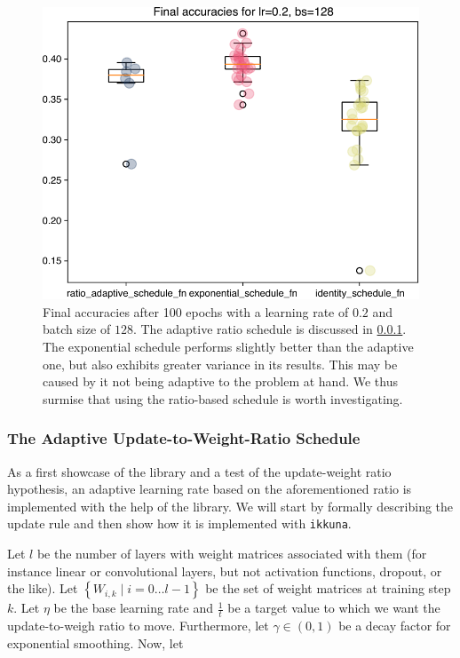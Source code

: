 \begin{figure}
    \centering
    \includegraphics[width=\linewidth]{gfx/diagrams/experiments/experiment_validation.pdf}
    \caption[Fixed-Ratio: Final accuracies after 100 epochs]{Final accuracies
        after 100 epochs with a learning rate of $0.2$ and batch size of $128$.
        The adaptive ratio schedule is discussed in \cref{subsec:ratio-schedule}.
        The exponential schedule performs slightly better than the adaptive one,
        but also exhibits greater variance in its results. This may be caused by
        it not being adaptive to the problem at hand. We thus surmise that using the
        ratio-based schedule is worth investigating.}
    \label{fig:validation1}
\end{figure}

\subsubsection{The Adaptive Update-to-Weight-Ratio Schedule}\label{subsec:ratio-schedule}%

As a first showcase of the library and a test of the update-weight ratio
hypothesis, an adaptive learning rate based on the aforementioned ratio is
implemented with the help of the library.  We will start by formally describing
the update rule and then show how it is implemented with \texttt{ikkuna}.

Let $l$ be the number of layers with weight matrices associated with them (for
instance linear or convolutional layers, but not activation functions, dropout,
or the like). Let $\left\{W_{i,k} \mid i = 0 \ldots l - 1\right\}$ be the set of weight
matrices at training step $k$.  Let $\eta$ be the base learning rate and
$\frac{1}{t}$ be a target value to which we want the update-to-weigh ratio to
move. Furthermore, let $\gamma \in (0, 1)$ be a decay factor for exponential
smoothing.  Now, let

